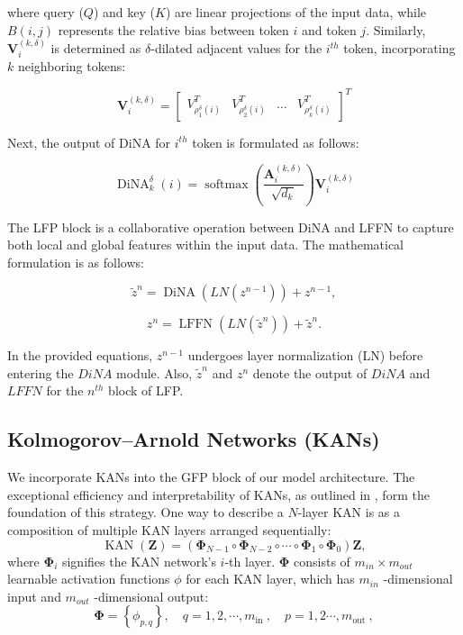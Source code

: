 \documentclass[times,twocolumn,final]{elsarticle}
\begin{document}
\noindent
where query ($Q$) and key ($K$) are linear projections of the input data, while $B(i,j)$ represents the relative bias between token $i$ and token $j$. Similarly, $\mathbf{V}_i^{(k, \delta)}$ is determined as $\delta$-dilated adjacent values for the $i^{th}$ token, incorporating $k$ neighboring tokens:

$$
\mathbf{V}_i^{(k, \delta)}=\left[\begin{array}{llll}
V_{\rho_1^\delta(i)}^T & V_{\rho_2^\delta(i)}^T & \ldots & V_{\rho_k^\delta(i)}^T
\end{array}\right]^T
$$

\noindent
Next, the output of DiNA for $i^{th}$ token is formulated as follows:

$$
\operatorname{DiNA}_k^\delta(i)=\operatorname{softmax}\left(\frac{\mathbf{A}_i^{(k, \delta)}}{\sqrt{d_k}}\right) \mathbf{V}_i^{(k, \delta)}
$$

\noindent
The LFP block is a collaborative operation between DiNA and LFFN to capture both local and global features within the input data. The mathematical formulation is as follows:

\begin{equation}
\tilde{z}^{n} =\operatorname{DiNA}(LN(z^{n-1}))+z^{n-1},
\end{equation}

\begin{equation}
z^{n} =\operatorname{LFFN}(LN(\tilde{z}^{n}))+\tilde{z}^{n}.
\end{equation}

\noindent
In the provided equations, $z^{n-1}$ undergoes layer normalization (LN) before entering the $DiNA$ module. Also, $\tilde{z}^{n}$ and $z^{n}$ denote the output of $DiNA$ and $LFFN$ for the $n^{th}$ block of LFP.

\subsection{Kolmogorov–Arnold Networks (KANs)}

We incorporate KANs into the GFP block of our model architecture. The exceptional efficiency and interpretability of KANs, as outlined in \cite{liu2024kan}, form the foundation of this strategy.
One way to describe a $N$-layer KAN is as a composition of multiple KAN layers arranged sequentially:
\begin{equation}
    \operatorname{KAN}(\mathbf{Z})=\left(\boldsymbol{\Phi}_{N-1} \circ \boldsymbol{\Phi}_{N-2} \circ \cdots \circ \boldsymbol{\Phi}_{1} \circ \boldsymbol{\Phi}_{0}\right) \mathbf{Z},
\end{equation}
where $\boldsymbol{\Phi}_i$ signifies the KAN network's $i$-th layer. $\boldsymbol{\Phi}$ consists of $ m_{in} \times m_{out}$ learnable activation functions $\phi$ for each KAN layer, which has $m_{in}$ -dimensional input and $m_{out}$ -dimensional output:
\begin{equation}
    \boldsymbol{\Phi}=\left\{\phi_{p, q}\right\}, \quad q=1,2, \cdots, m_{\text {in }}, \quad p=1,2 \cdots, m_{\text {out }},
\end{equation}
\end{document}
